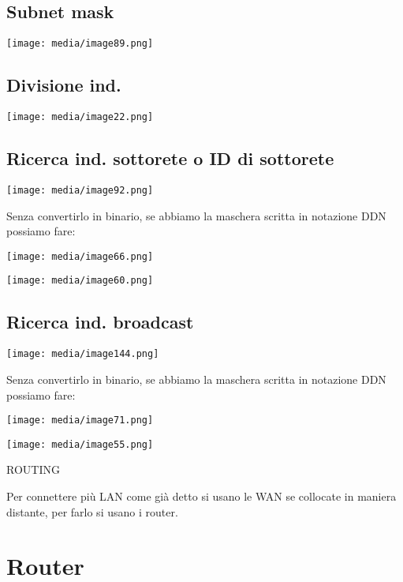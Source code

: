 \subsection{Subnet mask}\label{subnet-mask}

\texttt{[image: media/image89.png]}

\subsection{Divisione ind.}\label{divisione-ind.}

\texttt{[image: media/image22.png]}

\subsection{Ricerca ind. sottorete o ID di
sottorete}\label{ricerca-ind.-sottorete-o-id-di-sottorete}

\texttt{[image: media/image92.png]}

Senza convertirlo in binario, se abbiamo la maschera scritta in
notazione DDN possiamo fare:

\texttt{[image: media/image66.png]}

\texttt{[image: media/image60.png]}

\subsection{Ricerca ind. broadcast}\label{ricerca-ind.-broadcast}

\texttt{[image: media/image144.png]}

Senza convertirlo in binario, se abbiamo la maschera scritta in
notazione DDN possiamo fare:

\texttt{[image: media/image71.png]}

\texttt{[image: media/image55.png]}

ROUTING

Per connettere più LAN come già detto si usano le WAN se collocate in
maniera distante, per farlo si usano i router.

\section{Router}\label{router}

